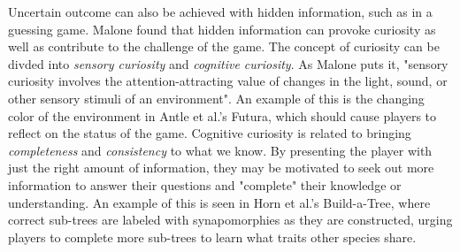 Uncertain outcome can also be achieved with hidden information, such as in a guessing game. Malone found that hidden information can provoke curiosity as well as contribute to the challenge of the game. The concept of curiosity can be divded into \emph{sensory curiosity} and \emph{cognitive curiosity}. As Malone puts it, "sensory curiosity involves the attention-attracting value of changes in the light, sound, or other sensory stimuli of an environment". An example of this is the changing color of the environment in Antle et al.'s Futura, which should cause players to reflect on the status of the game. Cognitive curiosity is related to bringing \emph{completeness} and \emph{consistency} to what we know. By presenting the player with just the right amount of information, they may be motivated to seek out more information to answer their questions and "complete" their knowledge or understanding. An example of this is seen in Horn et al.'s Build-a-Tree, where correct sub-trees are labeled with synapomorphies as they are constructed, urging players to complete more sub-trees to learn what traits other species share.